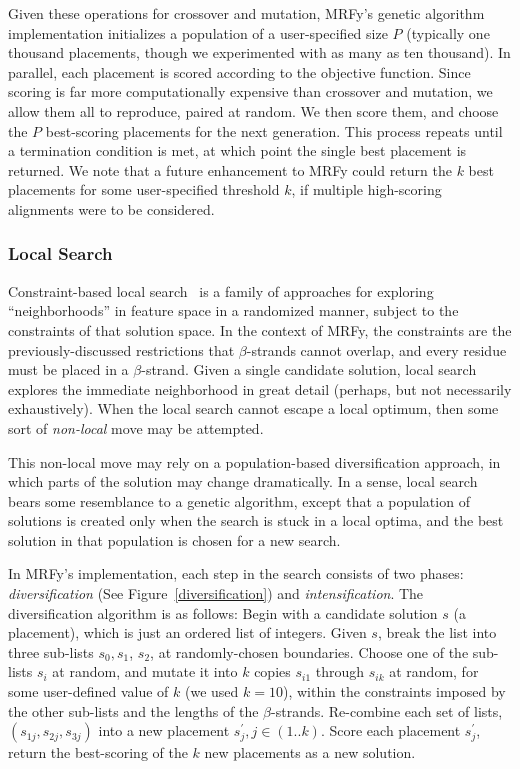 \documentclass[blockstyle,times,preprint]{sigplanconf}
\begin{document}
Given these operations for crossover and mutation, MRFy's genetic algorithm
implementation initializes a population of a user-specified size $P$ (typically 
one thousand placements, though we experimented with as many as ten thousand).
In parallel, each placement is scored according to the objective function.
Since scoring is far more computationally expensive than crossover and mutation,
we allow them all to reproduce, paired at random.
We then score them, and choose the $P$ best-scoring placements for the next
generation.
This process repeats until a termination condition is met, at which point the
single best placement is returned.
We note that a future enhancement to MRFy could return the $k$ best placements
for some user-specified threshold $k$, if multiple high-scoring alignments were
to be considered.


\subsubsection{Local Search}\label{localsearch}

Constraint-based local search~\cite{Hentenryck:2009vn} is a family of approaches
for exploring ``neighborhoods'' in feature space in a randomized manner, 
subject to the constraints of that solution space.
In the context of MRFy, the constraints are the previously-discussed 
restrictions that $\beta$-strands cannot overlap, and every residue must be
placed in a $\beta$-strand.
Given a single candidate solution, local search explores the immediate 
neighborhood in great detail (perhaps, but not necessarily exhaustively).
When the local search cannot escape a local optimum, then some sort of 
\emph{non-local} move may be attempted.

This non-local move may rely on a population-based diversification approach,
in which parts of the solution may change dramatically.
In a sense, local search bears some resemblance to a genetic algorithm,
except that a population of solutions is created only when the search is stuck
in a local optima, and the best solution in that population is chosen for a new
search.

In MRFy's implementation, each step in the search consists of two phases: 
\emph{diversification} (See Figure~\ref{diversification}) and 
\emph{intensification}.
The diversification algorithm is as follows:
Begin with a candidate solution $s$ (a placement), which is just
an ordered list of integers.
Given $s$, break the list into three sub-lists $s_{0}, s_{1}$, $s_{2}$, 
at randomly-chosen boundaries.
Choose one of the sub-lists $s_{i}$ at random, and mutate it into $k$ 
copies $s_{i1}$ through $s_{ik}$ at random, for some user-defined value of $k$ 
(we used $k=10$), within
the constraints imposed by the other sub-lists and the lengths of the 
$\beta$-strands.
Re-combine each set of lists, $(s_{1j}, s_{2j}, s_{3j})$ into a new 
placement $s^{\prime}_{j}, j \in (1..k)$.
Score each placement $s^{\prime}_{j}$, return the best-scoring of the $k$ new 
placements as a new solution.
\end{document}

